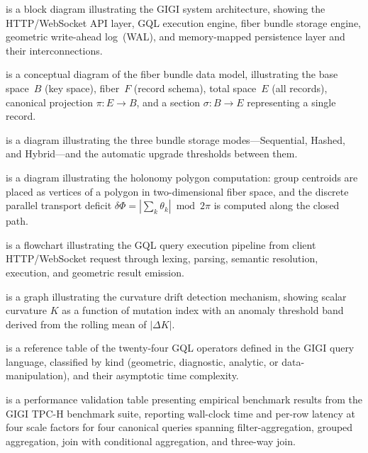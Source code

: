 \documentclass[11pt,letterpaper]{article}
\begin{document}
\begin{description}[leftmargin=2.2em, labelwidth=2em]
  \item[\textbf{FIG.~1}] is a block diagram illustrating the GIGI system
    architecture, showing the HTTP/WebSocket API layer, GQL execution engine,
    fiber bundle storage engine, geometric write-ahead log~(WAL), and
    memory-mapped persistence layer and their interconnections.

  \item[\textbf{FIG.~2}] is a conceptual diagram of the fiber bundle data
    model, illustrating the base space~$B$ (key space), fiber~$F$ (record
    schema), total space~$E$ (all records), canonical projection
    $\pi: E \!\to\! B$, and a section $\sigma: B \!\to\! E$ representing a
    single record.

  \item[\textbf{FIG.~3}] is a diagram illustrating the three bundle storage
    modes---Sequential, Hashed, and Hybrid---and the automatic upgrade
    thresholds between them.

  \item[\textbf{FIG.~4}] is a diagram illustrating the holonomy polygon
    computation: group centroids are placed as vertices of a polygon in
    two-dimensional fiber space, and the discrete parallel transport deficit
    $\delta\Phi = |\sum_k \theta_k| \bmod 2\pi$ is computed along the closed
    path.

  \item[\textbf{FIG.~5}] is a flowchart illustrating the GQL query execution
    pipeline from client HTTP/WebSocket request through lexing, parsing,
    semantic resolution, execution, and geometric result emission.

  \item[\textbf{FIG.~6}] is a graph illustrating the curvature drift detection
    mechanism, showing scalar curvature $K$ as a function of mutation index
    with an anomaly threshold band derived from the rolling mean of
    $|\Delta K|$.

  \item[\textbf{TABLE~I}] is a reference table of the twenty-four GQL
    operators defined in the GIGI query language, classified by kind
    (geometric, diagnostic, analytic, or data-manipulation), and their
    asymptotic time complexity.

  \item[\textbf{TABLE~II}] is a performance validation table presenting
    empirical benchmark results from the GIGI TPC-H benchmark suite,
    reporting wall-clock time and per-row latency at four scale factors for
    four canonical queries spanning filter-aggregation, grouped aggregation,
    join with conditional aggregation, and three-way join.


\end{description}
\end{document}
